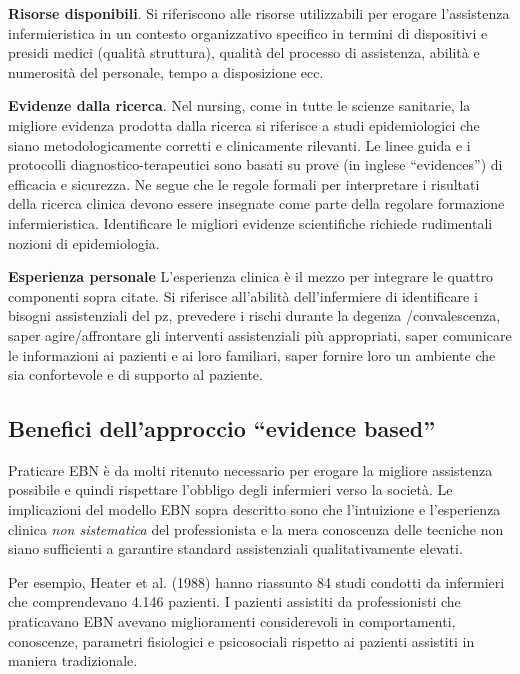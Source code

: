 \documentclass[]{book}
\begin{document}
\textbf{Risorse disponibili}. Si riferiscono alle risorse utilizzabili per erogare l'assistenza infermieristica in un contesto organizzativo specifico in termini di dispositivi e presidi medici (qualità struttura), qualità del processo di assistenza, abilità e numerosità del personale, tempo a disposizione ecc.

\textbf{Evidenze dalla ricerca}. Nel nursing, come in tutte le scienze sanitarie, la migliore evidenza prodotta dalla ricerca si riferisce a studi epidemiologici che siano metodologicamente corretti e clinicamente rilevanti. Le linee guida e i protocolli diagnostico-terapeutici sono basati su prove (in inglese ``evidences'') di efficacia e sicurezza. Ne segue che le regole formali per interpretare i risultati della ricerca clinica devono essere insegnate come parte della regolare formazione infermieristica. Identificare le migliori evidenze scientifiche richiede rudimentali nozioni di epidemiologia.

\textbf{Esperienza personale}
L'esperienza clinica è il mezzo per integrare le quattro componenti sopra citate. Si riferisce all'abilità dell'infermiere di identificare i bisogni assistenziali del pz, prevedere i rischi durante la degenza /convalescenza, saper agire/affrontare gli interventi assistenziali più appropriati, saper comunicare le informazioni ai pazienti e ai loro familiari, saper fornire loro un ambiente che sia confortevole e di supporto al paziente.

\hypertarget{benefici-dellapproccio-evidence-based}{%
\subsection{Benefici dell'approccio ``evidence based''}\label{benefici-dellapproccio-evidence-based}}

Praticare EBN è da molti ritenuto necessario per erogare la migliore assistenza possibile e quindi rispettare l'obbligo degli infermieri verso la società. Le implicazioni del modello EBN sopra descritto sono che l'intuizione e l'esperienza clinica \emph{non sistematica} del professionista e la mera conoscenza delle tecniche non siano sufficienti a garantire standard assistenziali qualitativamente elevati.

Per esempio, Heater et al. (1988) hanno riassunto 84 studi condotti da infermieri che comprendevano 4.146 pazienti. I pazienti assistiti da professionisti che praticavano EBN avevano miglioramenti considerevoli in comportamenti, conoscenze, parametri fisiologici e psicosociali rispetto ai pazienti assistiti in maniera tradizionale.
\end{document}
